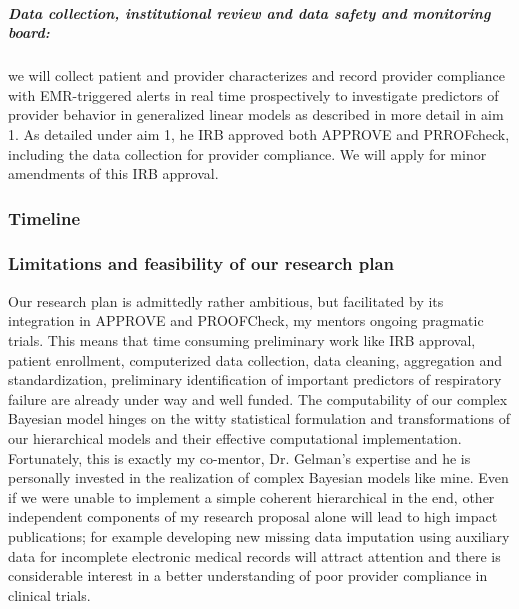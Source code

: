 \documentclass[11pt,notitlepage]{article}
\begin{document}
\subparagraph*{Data collection, institutional review and data safety and monitoring board:} we will collect patient and provider characterizes and record provider compliance with EMR-triggered alerts in real time prospectively to investigate predictors of provider behavior in generalized linear models as described in more detail in aim 1. As detailed under aim 1, he IRB approved both APPROVE and PRROFcheck, including the data collection for provider compliance. We will apply for minor amendments of this IRB approval.

\subsubsection*{Timeline}

\subsubsection*{Limitations and feasibility of our research plan }
Our research plan is admittedly rather ambitious, but facilitated by its integration in APPROVE and PROOFCheck, my mentors ongoing pragmatic trials. This means that time consuming preliminary work like IRB approval, patient enrollment, computerized data collection, data cleaning, aggregation and standardization, preliminary identification of important predictors of respiratory failure are already under way and well funded. The computability of our complex Bayesian model hinges on the witty statistical formulation and transformations of our hierarchical models and their effective computational implementation. Fortunately, this is exactly my co-mentor, Dr. Gelman's expertise and he is personally invested in the realization of complex Bayesian models like mine. Even if we were unable to implement a simple coherent hierarchical in the end, other independent components of my research proposal alone will lead to high impact publications; for example developing new missing data imputation using auxiliary data for incomplete electronic medical records will attract attention and there is considerable interest in a better understanding of poor provider compliance in clinical trials. 
\end{document}
